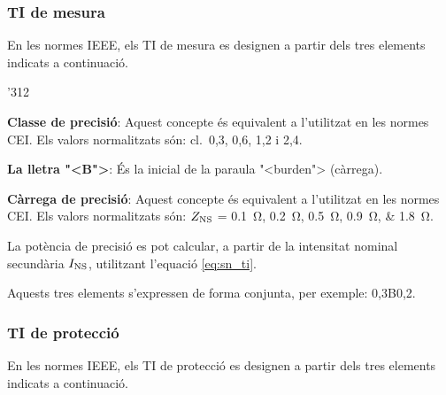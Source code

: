 \subsubsection{TI de mesura}

En les normes \textsf{IEEE}, els TI de mesura  es designen a partir
dels tres elements indicats a continuaci\'{o}.

\begin{dingautolist}{'312}
    \item \textbf{Classe de precisi\'{o}}: Aquest concepte \'{e}s equivalent
    a l'utilitzat en les normes \textsf{CEI}. Els valors
    normalitzats s\'{o}n: cl.~0,3, 0,6, 1,2 i 2,4.
    \item \textbf{La lletra {"<}B{">}}: \'{E}s la inicial de la paraula
    {"<}burden{">}  (c\`{a}rrega).
    \item \textbf{C\`{a}rrega de precisi\'{o}}: Aquest concepte \'{e}s equivalent
    a l'utilitzat en les normes \textsf{CEI}. Els valors
    normalitzats s\'{o}n: $Z_\mathrm{NS}$ = \SIlist{0,1;0,2;0,5;0,9;1,8}{\ohm}.

    La pot\`{e}ncia de precisi\'{o} es pot calcular, a partir de la
    intensitat nominal secund\`{a}ria $I_\mathrm{NS}$, utilitzant l'equaci\'{o}
    \eqref{eq:sn_ti}.
\end{dingautolist}

Aquests tres elements s'expressen de forma conjunta, per exemple:
0,3B0,2.

\subsubsection{TI de protecci\'{o}}

En les normes \textsf{IEEE}, els TI de protecci\'{o} es designen a
partir dels tres elements indicats a continuaci\'{o}.

